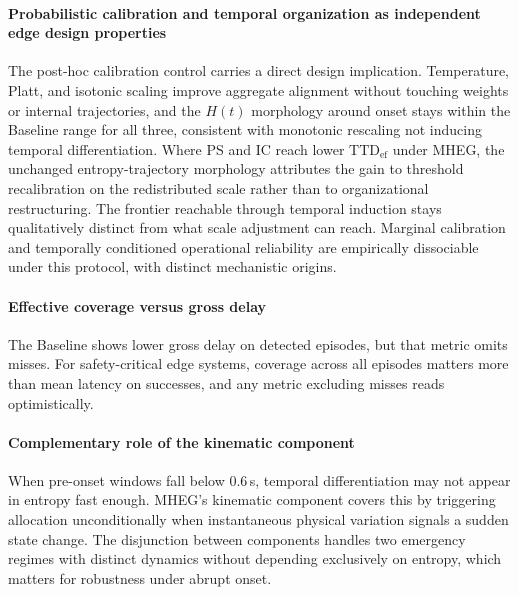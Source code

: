 \documentclass[a4paper,fleqn]{cas-dc}
\newcommand{\MHEG}{\mbox{MHEG}\xspace}
\begin{document}
\paragraph{Probabilistic calibration and temporal organization as
independent edge design properties}
The post-hoc calibration control carries a direct design implication.
Temperature, Platt, and isotonic scaling improve aggregate alignment without
touching weights or internal trajectories, and the $H(t)$ morphology around
onset stays within the Baseline range for all three, consistent with monotonic
rescaling not inducing temporal differentiation. Where PS and IC reach lower
$\mathrm{TTD}_{\mathrm{ef}}$ under \MHEG, {\color{\revcolor}the unchanged
entropy-trajectory morphology} attributes the gain to threshold recalibration on
the redistributed scale rather than to organizational restructuring. The frontier reachable through temporal
induction stays qualitatively distinct from what scale adjustment can reach.
Marginal calibration and temporally conditioned operational reliability are
empirically dissociable under this protocol, with distinct mechanistic origins.
\paragraph{Effective coverage versus gross delay}
The Baseline shows lower gross delay on detected episodes, but that metric omits
misses. For safety-critical edge systems, coverage across all episodes matters
more than mean latency on successes, and any metric excluding misses reads
optimistically.
\paragraph{Complementary role of the kinematic component}
When pre-onset windows fall below 0.6\,s, temporal differentiation may not
appear in entropy fast enough. \MHEG's kinematic component covers this by
triggering allocation unconditionally when instantaneous physical variation
signals a sudden state change. The disjunction between components handles two
emergency regimes with distinct dynamics without depending exclusively on
entropy, which matters for robustness under abrupt onset.
\end{document}
